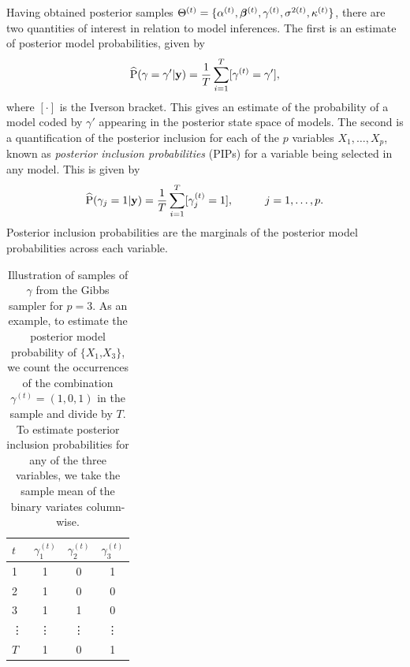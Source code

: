 \documentclass[11pt,twoside,openright]{report}
\begin{document}
Having obtained posterior samples $\Theta^{(t)}=\{\alpha^{(t)},{\bm\beta}^{(t)},\gamma^{(t)},\sigma^{2(t)},\kappa^{(t)} \}$, there are two quantities of interest in relation to model inferences. 
The first is an estimate of posterior model probabilities, given by
\begin{align}\label{eq:pmp-prop}
  \widehat {\operatorname{P}}(\gamma = \gamma' | {\mathbf y}) = \frac{1}{T}\sum_{i=1}^T [\gamma^{(t)} = \gamma'],
\end{align}
where $[\cdot]$ is the Iverson bracket.
This gives an estimate of the probability of a model coded by $\gamma'$ appearing in the posterior state space of models.
The second is a quantification of the posterior inclusion for each of the $p$ variables $X_1,\dots,X_p$, known as \emph{posterior inclusion probabilities} (PIPs) for a variable being selected in any model.
This is given by
\begin{align}\label{eq:pip-prop}
  \widehat {\operatorname{P}}(\gamma_j = 1 | {\mathbf y}) = \frac{1}{T}\sum_{i=1}^T [\gamma_j^{(t)} = 1], \hspace{1cm} j=1,\dots,p.
\end{align}
Posterior inclusion probabilities are the marginals of the posterior model probabilities across each variable.

\begin{table}[hbt]
  \centering  
  \caption[Illustration of samples of $\gamma$ from the Gibbs sampler]{Illustration of samples of $\gamma$ from the Gibbs sampler for $p=3$. As an example, to estimate the posterior model probability of $\{X_1$,$X_3\}$, we count the occurrences of the combination $\gamma^{(t)}=(1,0,1)$ in the sample and divide by $T$. To estimate posterior inclusion probabilities for any of the three variables, we take the sample mean of the binary variates column-wise.}
  \begin{tabular}{lccc}
    \toprule
    $t$ &$\gamma_1^{(t)}$ &$\gamma_2^{(t)}$ &$\gamma_3^{(t)}$ \\
    \midrule
    1  &1 &0 &1 \\
    2  &1 &0 &0 \\
    3  &1 &1 &0 \\
    \vdots &\vdots &\vdots &\vdots \\
    $T$  &1 &0 &1 \\
    \bottomrule
  \end{tabular}
\end{table}
\end{document}
